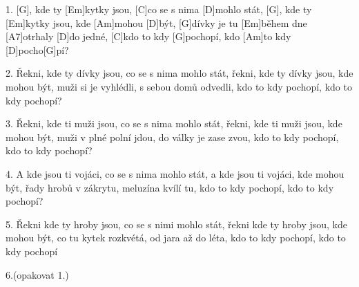 
1. [G], kde ty [Em]kytky jsou, [C]co se s nima [D]mohlo stát,
[G], kde ty [Em]kytky jsou, kde [Am]mohou [D]být,
[G]dívky je tu [Em]během dne [A7]otrhaly [D]do jedné,
[C]kdo to kdy [G]pochopí, kdo [Am]to kdy [D]pocho[G]pí?

2. Řekni, kde ty dívky jsou, co se s nima mohlo stát,
řekni, kde ty dívky jsou, kde mohou být,
muži si je vyhlédli, s sebou domů odvedli,
kdo to kdy pochopí, kdo to kdy pochopí?

3. Řekni, kde ti muži jsou, co se s nima mohlo stát,
řekni, kde ti muži jsou, kde mohou být,
muži v plné polní jdou, do války je zase zvou,
kdo to kdy pochopí, kdo to kdy pochopí?

4. A kde jsou ti vojáci, co se s nima mohlo stát,
a kde jsou ti vojáci, kde mohou být,
řady hrobů v zákrytu, meluzína kvílí tu,
kdo to kdy pochopí, kdo to kdy pochopí?

5. Řekni kde ty hroby jsou, co se s nimi mohlo stát,
řekni kde ty hroby jsou, kde mohou být,
co tu kytek rozkvétá, od jara až do léta,
kdo to kdy pochopí, kdo to kdy pochopí


6.(opakovat 1.)